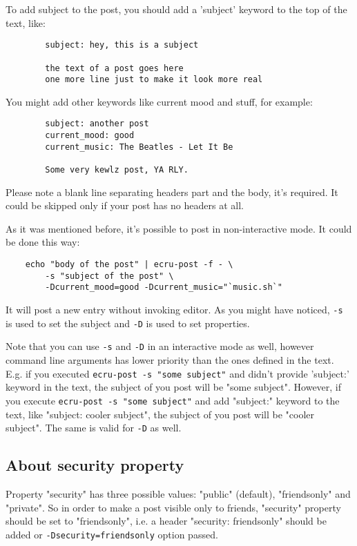 \documentclass{article}
\begin{document}
	To add subject to the post, you should add a 'subject' keyword to the top of the text, like:
	\begin{verbatim}
		subject: hey, this is a subject

		the text of a post goes here
		one more line just to make it look more real
    	\end{verbatim}

	You might add other keywords like current mood and stuff, for example:
	
	\begin{verbatim}
		subject: another post
		current_mood: good
		current_music: The Beatles - Let It Be
	
		Some very kewlz post, YA RLY.
	\end{verbatim}

	Please note a blank line separating headers part and the body, it's required. It could be skipped
	only if your post has no headers at all.

	As it was mentioned before, it's possible to post in non-interactive mode. It could be done this way:
	
	\begin{verbatim}
	echo "body of the post" | ecru-post -f - \
		-s "subject of the post" \
		-Dcurrent_mood=good -Dcurrent_music="`music.sh`"
	\end{verbatim}

	It will post a new entry without invoking editor. As you might have noticed, {\tt -s } is used to set the subject
	and {\tt -D} is used to set properties. 

	Note that you can use {\tt -s} and {\tt -D} in an interactive mode as well, however command line arguments has
	lower priority than the ones defined in the text. E.g. if you executed {\tt ecru-post -s "some subject"} and
	didn't provide 'subject:' keyword in the text, the subject of you post will be "some subject". However, if
	you execute {\tt ecru-post -s "some subject"} and add "subject:" keyword to the text, like "subject: cooler
	subject", the subject of you post will be "cooler subject". The same is valid for {\tt -D} as well.

	\subsection{About security property}
	Property "security" has three possible values: "public" (default), "friendsonly" and "private". So in order
	to make a post visible only to friends, "security" property should be set to "friendsonly", i.e. a header
	"security: friendsonly" should be added or {\tt -Dsecurity=friendsonly} option passed.
\end{document}

